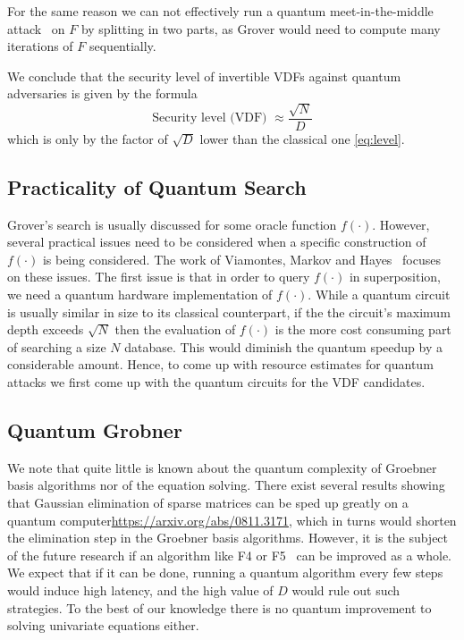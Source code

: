 For the same reason we can not effectively run a quantum meet-in-the-middle attack~\cite{DBLP:journals/sigact/BrassardHT97} on $F$ by splitting in two parts, as Grover would need to compute many iterations of $F$ sequentially.

We conclude that the security level of invertible VDFs against quantum adversaries is given by the formula
 \begin{equation}\label{eq:level2}
     \text{Security level (VDF) }\approx {\frac{\sqrt{N}}{D}} \end{equation}
which is only by the factor of $\sqrt{D}$ lower than the classical one \eqref{eq:level}.


\subsection{Practicality of Quantum Search}

Grover's search is usually discussed for some oracle function $f(\cdot)$. However, several practical issues need to be considered when a specific construction of $f(\cdot)$ is being considered. The work of Viamontes, Markov and Hayes~\cite{practicalityGrover05} focuses on these issues.  The first issue is that in order to query $f(\cdot)$ in superposition, we need a quantum hardware implementation of  $f(\cdot)$. While a quantum circuit is usually similar in size to its classical counterpart, if the the circuit's maximum depth exceeds $\sqrt{N}$ then the evaluation of  $f(\cdot)$ is the more cost consuming part of searching a size $N$ database. This would diminish the quantum speedup by a considerable amount. Hence, to come up with resource estimates for quantum attacks we first come up with the quantum circuits for the VDF candidates. 


\subsection{Quantum Grobner}

We note that quite little is known about the quantum complexity of Groebner basis algorithms nor of the equation solving. There exist several results showing that Gaussian elimination of sparse matrices can be sped up greatly on a quantum computer\url{https://arxiv.org/abs/0811.3171}, which in turns would shorten the elimination step in the Groebner basis algorithms. However, it is the subject of the future research if an algorithm like F4 or F5~\cite{faugere2002new} can be improved as a whole. We expect that if it can be done, running a quantum algorithm every few steps would induce high latency, and the high value of $D$ would rule out such strategies. To the best of our knowledge there is no quantum improvement to solving univariate equations either.
 
